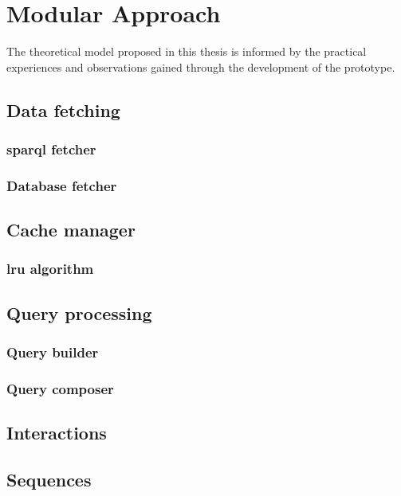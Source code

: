 \chapter{Modular Approach} \label{ch:modularApproach}
The theoretical model proposed in this thesis is informed by the practical experiences and observations gained through the development of the prototype.

\section{Data fetching}

\subsection{\acs{sparql} fetcher}

\subsection{Database fetcher}

\section{Cache manager}

\subsection{\acs{lru} algorithm}

\section{Query processing}

\subsection{Query builder}

\subsection{Query composer}

\section{Interactions}

\section{Sequences}
